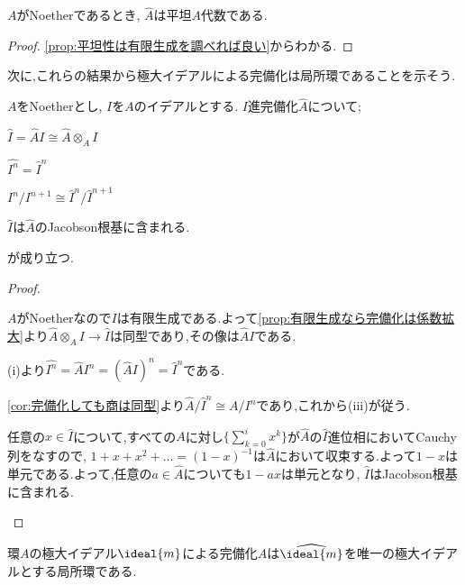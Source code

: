 \begin{cor}
	$A$がNoetherであるとき, $\widehat{A}$は平坦$A$代数である.
\end{cor}

\begin{proof}
	\ref{prop:平坦性は有限生成を調べれば良い}からわかる.
\end{proof}

次に,これらの結果から極大イデアルによる完備化は局所環であることを示そう.

\begin{lem}\label{lem:完備化に関してのもろもろの補題}
	$A$をNoetherとし, $I$を$A$のイデアルとする. $I$進完備化$\widehat{A}$について;
	\begin{sakura}
		\item $\widehat{I}=\widehat{A}I\cong\widehat{A}\otimes_A I$
		\item $\widehat{I^n}=\widehat{I}^n$
		\item $I^n/I^{n+1}\cong\widehat{I}^n/\widehat{I}^{n+1}$
		\item $\widehat{I}$は$\widehat{A}$のJacobson根基に含まれる.
	\end{sakura}
	が成り立つ.
\end{lem}

\begin{proof}
	\begin{sakura}
		\item $A$がNoetherなので$I$は有限生成である.よって\ref{prop:有限生成なら完備化は係数拡大}より$\widehat{A}\otimes_A I\to\widehat{I}$は同型であり,その像は$\widehat{A}I$である.
		
		\item (i)より$\widehat{I^n}=\widehat{A}I^n=(\widehat{A}I)^n=\widehat{I}^n$である.
		
		\item \ref{cor:完備化しても商は同型}より$\widehat{A}/\widehat{I}^n\cong A/I^n$であり,これから(iii)が従う.
		
		\item 任意の$x\in\widehat{I}$について,すべての$A$に対し$\{\sum_{k=0}^i x^k\}$が$\widehat{A}$の$\widehat{I}$進位相においてCauchy列をなすので, $1+x+x^2+\dots=(1-x)^{-1}$は$\widehat{A}$において収束する.よって$1-x$は単元である.よって,任意の$a\in\widehat{A}$についても$1-ax$は単元となり, $\widehat{I}$はJacobson根基に含まれる.
	\end{sakura}
\end{proof}

\begin{prop}
	環$A$の極大イデアル$\ideal{m}$による完備化$\widehat{A}$は$\widehat{\ideal{m}}$を唯一の極大イデアルとする局所環である.
\end{prop}

